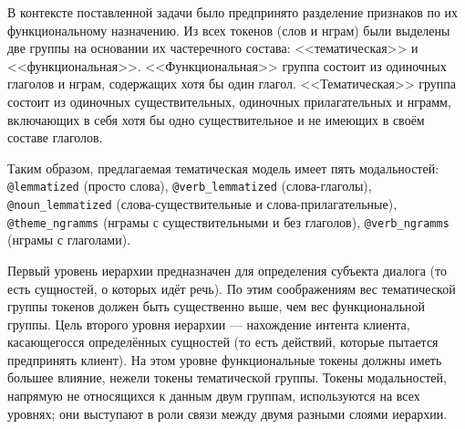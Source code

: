В контексте поставленной задачи было предпринято разделение признаков по их функциональному назначению. Из всех токенов (слов и нграм) были выделены две группы на основании их частеречного состава: <<тематическая>> и <<функциональная>>. <<Функциональная>> группа состоит из одиночных глаголов и нграм, содержащих хотя бы один глагол. <<Тематическая>> группа состоит из одиночных существительных, одиночных прилагательных и нграмм, включающих в себя хотя бы одно существительное и не имеющих в своём составе глаголов.

Таким образом, предлагаемая тематическая модель имеет пять модальностей: \texttt{@lemmatized} (просто слова), \texttt{@verb\_lemmatized} (слова-глаголы), \texttt{@noun\_lemmatized} (слова-существительные и слова-прилагательные), \texttt{@theme\_ngramms} (нграмы с существительными и без глаголов), \texttt{@verb\_ngramms} (нграмы с глаголами).


\par Первый уровень иерархии предназначен для определения субъекта диалога (то есть сущностей, о которых идёт речь). По этим соображениям вес тематической группы токенов должен быть существенно выше, чем вес функциональной группы. Цель второго уровня иерархии --- нахождение интента клиента, касающегосся определённых сущностей (то есть действий, которые пытается предпринять клиент). На этом уровне функциональные токены должны иметь большее влияние, нежели токены тематической группы. Токены модальностей, напрямую не относящихся к данным двум группам, используются на всех уровнях; они выступают в роли связи между двумя разными слоями иерархии.

